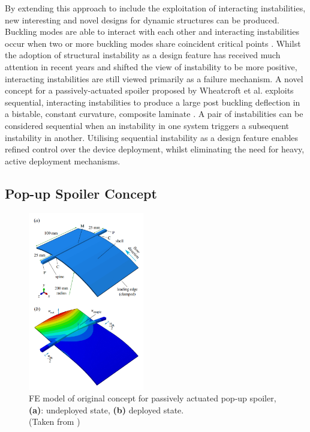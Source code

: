 \documentclass{IEEEtran}
\begin{document}
         By extending this approach to include the exploitation of interacting instabilities, new interesting and novel designs for dynamic structures can be produced. Buckling modes are able to interact with each other and interacting instabilities occur when two or more buckling modes share coincident critical points \cite{Wheatcroft_2023}. Whilst the adoption of structural instability as a design feature has received much attention in recent years and shifted the view of instability to be more positive, interacting instabilities are still viewed primarily as a failure mechanism. A novel concept for a passively-actuated spoiler proposed by Wheatcroft et al. exploits sequential, interacting instabilities to produce a large post buckling deflection in a bistable, constant curvature, composite laminate \cite{Wheatcroft_2023}. A pair of instabilities can be considered sequential when an instability in one system triggers a subsequent instability in another. Utilising sequential instability as a design feature enables refined control over the device deployment, whilst eliminating the need for heavy, active deployment mechanisms.
		
		\subsection{Pop-up Spoiler Concept}
		\begin{figure}[!h]
            \captionsetup{justification=centering}
			\centering{}
			\includegraphics[width=0.45\textwidth]{IntroductionImages/Concept.png}
            \caption{FE model of original concept for passively actuated pop-up spoiler, \textbf{(a)}: undeployed state, \textbf{(b)} deployed state. \\ (Taken from \cite{Wheatcroft_2023})}
			\label{fig:OGConcept}
		\end{figure}
	
\end{document}
